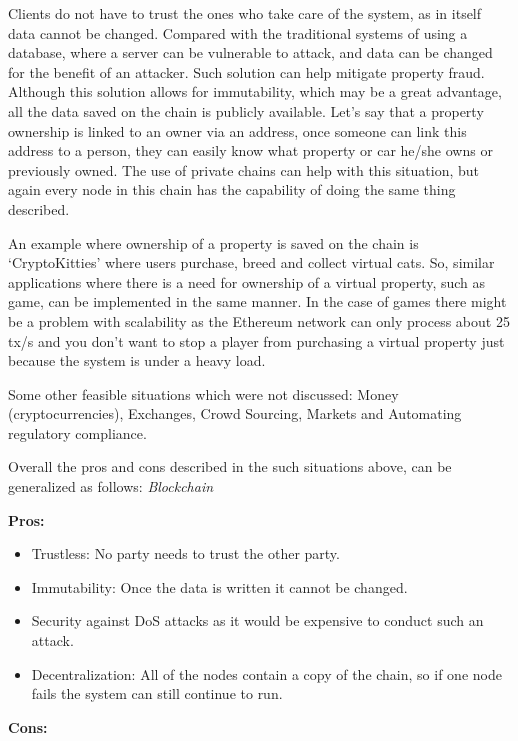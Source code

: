 \noindent
Clients do not have to trust the ones who take care of the system, as in itself data cannot be changed.  Compared with the traditional systems of using a database, where a server can be vulnerable to attack, and data can be changed for the benefit of an attacker. Such solution can help mitigate property fraud. Although this solution allows for immutability, which may be a great advantage, all the data saved on the chain is publicly available. Let’s say that a property ownership is linked to an owner via an address, once someone can link this address to a person, they can easily know what property or car he/she owns or previously owned. The use of private chains can help with this situation, but again every node in this chain has the capability of doing the same thing described. 

\noindent
An example where ownership of a property is saved on the chain is ‘CryptoKitties’ \cite{cryptokitties} where users purchase, breed and collect virtual cats. So, similar applications where there is a need for ownership of a virtual property, such as game, can be implemented in the same manner. In the case of games there might be a problem with scalability as the Ethereum network can only process about 25 tx/s and you don’t want to stop a player from purchasing a virtual property just because the system is under a heavy load. 

\noindent
Some other feasible situations which were not discussed: Money (cryptocurrencies), Exchanges, Crowd Sourcing, Markets and Automating regulatory compliance. 

\noindent
Overall the pros and cons described in the such situations above, can be generalized as follows: 
\noindent
\textit{Blockchain}

\noindent 
\textbf{Pros:}

\begin{itemize}
    \item Trustless: No party needs to trust the other party.
    \item Immutability: Once the data is written it cannot be changed.
    \item Security against DoS attacks as it would be expensive to conduct such an attack. 
    \item Decentralization: All of the nodes contain a copy of the chain, so if one node fails the system can still continue to run.
\end{itemize}

\noindent 
\textbf{Cons:}


